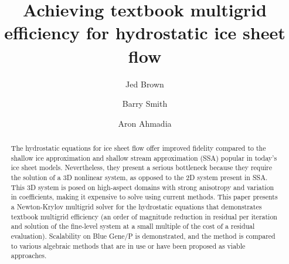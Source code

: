 \documentclass[draft,lineno,jgrga]{AGUTeX}
\begin{document}
\title{Achieving textbook multigrid efficiency for hydrostatic ice sheet flow}

\author{Jed Brown}
\author{Barry Smith}
\author{Aron Ahmadia}

\begin{abstract}
The hydrostatic equations for ice sheet flow offer improved fidelity compared to the shallow ice approximation and shallow stream approximation (SSA) popular in today's ice sheet models. Nevertheless, they present a serious bottleneck because they require the solution of a 3D nonlinear system, as opposed to the 2D system present in SSA.  This 3D system is posed on high-aspect domains with strong anisotropy and variation in coefficients, making it expensive to solve using current methods.  This paper presents a Newton-Krylov multigrid solver for the hydrostatic equations that demonstrates textbook multigrid efficiency (an order of magnitude reduction in residual per iteration and solution of the fine-level system at a small multiple of the cost of a residual evaluation).  Scalability on Blue Gene/P is demonstrated, and the method is compared to various algebraic methods that are in use or have been proposed as viable approaches.
\end{abstract}
\end{document}

